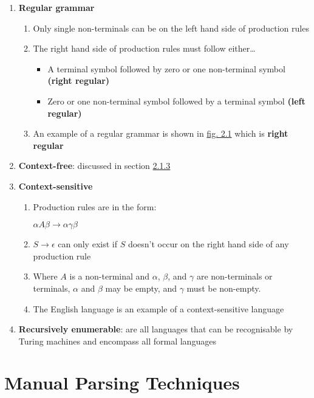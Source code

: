 \begin{enumerate}
    \item \textbf{Regular grammar}
    \begin{enumerate}
        \item Only single non-terminals can be on the left hand side of production rules
        \item The right hand side of production rules must follow either\dots
        \begin{itemize}
            \item A terminal symbol followed by zero or one non-terminal symbol \textbf{(right regular)}
            \item Zero or one non-terminal symbol followed by a terminal symbol \textbf{(left regular)}
        \end{itemize}
        \item An example of a regular grammar is shown in \hyperref[fig:2.1]{fig. 2.1} which is \textbf{right regular}
    \end{enumerate}
    \item \textbf{Context-free}: discussed in section \hyperref[sec:features-context-free]{2.1.3}
    \item \textbf{Context-sensitive}
    \begin{enumerate}
        \item Production rules are in the form:
        \begin{center}
            $\alpha A \beta \rightarrow \alpha \gamma \beta$
        \end{center}
        \item $S \rightarrow \epsilon$ can only exist if $S$ doesn't occur on the right hand side of any production rule
        \item Where $A$ is a non-terminal and $\alpha$, $\beta$, and $\gamma$ are non-terminals or terminals, $\alpha$ and $\beta$ may be empty, and $\gamma$ must be non-empty.
        \item The English language is an example of a context-sensitive language
    \end{enumerate}
    \item \textbf{Recursively enumerable}: are all languages that can be recognisable by Turing machines and encompass all formal languages\textsuperscript{\cite{geuvers_rot_2016}}
\end{enumerate}

\pagebreak

\section{Manual Parsing Techniques}

